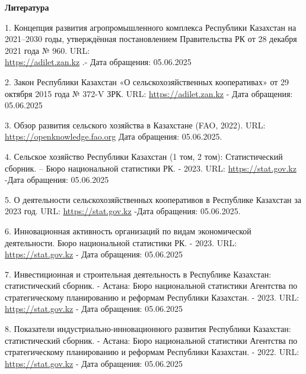 \begin{center}
{\bfseries Литература}
\end{center}

\begin{references}
1. Концепция развития агропромышленного комплекса Республики Казахстан
на 2021--2030 годы, утверждённая постановлением Правительства РК от 28
декабря 2021 года № 960. URL:\\
\href{https://adilet.zan.kz/rus/docs/P2100000960}{https://adilet.zan.kz} .- Дата обращения:
05.06.2025

2. Закон Республики Казахстан «О сельскохозяйственных кооперативах» от
29 октября 2015 года № 372-V ЗРК. URL:
\href{https://adilet.zan.kz/rus/docs/Z1500000372}{https://adilet.zan.kz} - Дата обращения:
05.06.2025

3. Обзор развития сельского хозяйства в Казахстане (FAO, 2022). URL:
\href{https://openknowledge.fao.org/bitstream/handle/20.500.14283/cc2651ru.pdf}{https://openknowledge.fao.org}
Дата обращения: 05.06.2025.

4. Сельское хозяйство Республики Казахстан (1 том, 2 том):
Статистический сборник. -- Бюро национальной статистики РК. - 2023.
URL: \href{https://stat.gov.kz/ru/publication/collections/?year=2023&name=17199&period=year}{https://stat.gov.kz}
-Дата обращения: 05.06.2025

5. О деятельности сельскохозяйственных кооперативов в Республике
Казахстан за 2023 год. URL:
\href{https://stat.gov.kz/api/iblock/element/182382/file/ru/}{https://stat.gov.kz} -Дата
обращения: 05.06.2025.

6. Инновационная активность организаций по видам экономической
деятельности. Бюро национальной статистики РК. - 2023. URL:
\href{https://stat.gov.kz/ru/industries/business-statistics/stat-inno-build/publications}{https://stat.gov.kz}
- Дата обращения: 05.06.2025

7. Инвестиционная и строительная деятельность в Республике Казахстан:
статистический сборник. - Астана: Бюро национальной статистики Агентства
по стратегическому планированию и реформам Республики Казахстан. - 2023.
URL:
\href{https://stat.gov.kz/ru/publication/collections/?year=2023&name=16821&period=year}{https://stat.gov.kz}
- Дата обращения: 05.06.2025

8. Показатели индустриально-инновационного развития Республики
Казахстан: статистический сборник. - Астана: Бюро национальной
статистики Агентства по стратегическому планированию и реформам
Республики Казахстан. - 2022.
URL: \href{https://stat.gov.kz/ru/publication/collections/?year=2022&name=16147&period}{https://stat.gov.kz}
- Дата обращения: 05.06.2025


\end{references}
